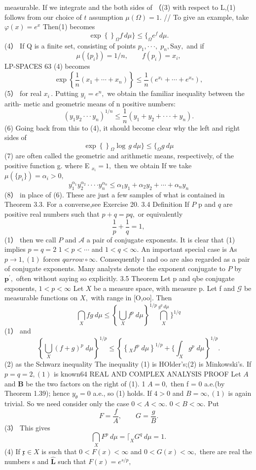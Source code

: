 measurable. If we integrate and the both sides of （(3) with respect to L,(1) follows from our choice of ${\mathbf{}}t$ assumption $\mu(\Omega)=1.$ // To give an example, take $\varphi(x)=e^{x}$ Then(1) becomes $$ \exp\left\{\right\}_{\Omega}f\,d\mu \}\leq \{_{\Omega}e^{f}\,d\mu. $$ (4） If Q is a finite set, consisting of points $p_{1},\cdot\cdot\cdot,\;p_{n},\mathrm{Say},$ and if $$ \mu(\{p_{i}\})=1/n,\qquad f(p_{i})=x_{i}, $$LP-SPACES 63 (4) becomes $$ \exp\left\{\frac{1}{n}\left(x_{1}+\cdots+x_{n}\right)\right\}\leq\frac{1}{n}\left(e^{x_{1}}+\cdots+e^{x_{n}}\right), $$ (5） for real $x_{i}\,.$ Putting $y_{i}=e^{n},$ we obtain the familiar inequality between the arith- metic and geometric means of n positive numbers: $$ (y_{1}y_{2}\cdot\cdot\cdot y_{n})^{1/n}\leq{\frac{1}{n}}\left(y_{1}+y_{2}+\cdot\cdot\cdot+y_{n}\right). $$ (6) Going back from this to (4), it should become clear why the left and right sides of $$ \exp\left\{\right\}_{\Omega}\log\,g\ d\mu \}\leq \{_{\Omega}g\ d\mu $$ (7) are often called the geometric and arithmetic means, respectively, of the positive function g. where E ${}_{x_{i}}=1,$ then we obtain If we take $\mu(\{p_{i}\})=\alpha_{i}>0,$ $$ y_{1}^{\alpha_{1}}y_{2}^{\alpha_{2}}\cdot\cdot\cdot\cdot y_{n}^{\alpha_{n}}\leq\alpha_{1}y_{1}+\alpha_{2}y_{2}+\cdots+\alpha_{n}y_{n} $$ (8） in place of (6). These are just a few samples of what is contained in Theorem 3.3. For a converse,see Exercise 20. 3.4 Definition If $\boldsymbol{\mathit{P}}$ p and $\boldsymbol{\mathit{q}}$ are positive real numbers such that $p+q=p q,$ or equivalently $$ {\frac{1}{p}}+{\frac{1}{q}}=1, $$ (1） then we call $\boldsymbol{\mathit{P}}$ and $\scriptstyle{\mathcal{A}}$ a pair of conjugate exponents. It is clear that (1) implies $p=q=2$ $1<p<\cdots$ and $1<q<\infty.$ An important special case is As $p\to1,(1)$ forces $q{ arrow}\circ\infty.$ Consequently l and oo are also regarded as a pair of conjugate exponents. Many analysts denote the exponent conjugate to $\boldsymbol{\mathit{P}}$ by ${\boldsymbol{p}}^{\prime},$ often without saying so explicitly. 3.5 Theorem Let p and qbe conjugate exponents, $1<p<\infty$ Let $X$ be a measure space, with measure p. Let f and $\scriptstyle{\mathcal{G}}$ be measurable functions on $X,$ with range in [O,oo]. Then $$ \bigcap_{X}f g\ d\mu\leq\left\{\bigcup_{X}f^{p}\ d\mu\right\}^{1/p}\bigcap_{X}^{g^{q}\ d\mu} \}^{1/q} $$ (1） and $$ \left\{\bigcup_{X}(f+g)^{p}\;d\mu\right\}^{1/p}\leq\left\{\left\{_{X}f^{p}\;d\mu\right\}^{1/p}+ \{\int_{X}g^{p}\;d\mu\right\}^{1/p}. $$ (2) as the Schwarz inequality The inequality (1) is HOlder's;(2) is Minkowski's. If $p=q=2,(1)$ is known64 REAL AND COMPLEX ANALYSIS PROOF Let $\scriptstyle A$ and $\boldsymbol{B}$ be the two factors on the right of (1). 1 $\scriptstyle A=0,$ then f = 0 a.e.(by Theorem 1.39); hence $\scriptstyle y_{\theta}=0$ a.e., so (1) holds. If $\scriptstyle4>0$ and $B=\infty,(1)$ is again trivial. So we need consider only the case $0<A<\infty.$ $0<B<\infty.$ Put $$ F={\frac{f}{A}},\qquad G={\frac{g}{B}}. $$ (3） This gives $$ \bigcap_{X}F^{p}~d\mu= \lceil_{X}G^{q}~d\mu=1. $$ (4) If ${\mathfrak{x}}\in X$ is such that $0<F(x)<\infty$ and $0<G(x)<\infty,$ there are real the numbers s and $\hat{\boldsymbol{L}}$ such that $F(x)=e^{s/p},$ 